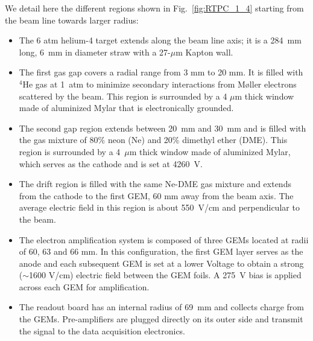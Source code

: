 \documentclass[preprint,5p]{elsarticle}
\begin{document}
We detail here the different regions shown in Fig.~\ref{fig:RTPC_1_4} starting 
from the beam line towards larger radius:\\
\begin{itemize}
   \item The 6 atm helium-4 target extends along the beam line axis; it 
      is a 284~mm long, 6~mm in diameter straw with a 27-$\mu$m Kapton wall.
   \item The first gas gap covers a radial range from 3 mm to 20 mm. It is 
      filled with $^{4}$He gas at 1~atm to minimize secondary interactions from
      M\o{}ller electrons scattered by the beam. This 
      region is surrounded by a 4 $\mu$m thick window made of aluminized Mylar 
      that is electronically grounded.
   \item The second gap region extends between 20~mm and 30~mm and is filled with the 
      gas mixture of 80$\%$ neon (Ne) and 20$\%$ dimethyl ether (DME). This region 
      is surrounded by a 4~$\mu$m thick window made of aluminized Mylar, which 
      serves as the cathode and is set at 4260~V.
   \item The drift region is filled with the same Ne-DME gas mixture and extends 
      from the cathode to the first GEM, 60 mm away 
      from the beam axis. The average electric field in this region is about 550~V/cm 
      and perpendicular to the beam.
   \item The electron amplification system is composed of three GEMs located at 
      radii of 60, 63 and 66 mm. In this configuration, the first GEM layer 
      serves as the anode and each subsequent GEM is set at a lower Voltage to
      obtain a strong ($\sim$1600 V/cm) electric field between the GEM foils. A 
      275~V bias is applied across each GEM for amplification.
   \item The readout board has an internal radius of 69~mm and collects charge
     from the GEMs. Pre-amplifiers are plugged directly on its outer side and
     transmit the signal to the data acquisition electronics.
\end{itemize}
\end{document}
